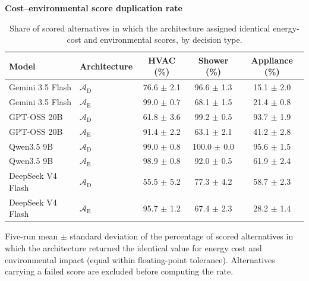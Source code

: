 \begin{table}[htbp]
\begin{threeparttable}
  \footnotesize
  \centering
  \textbf{Cost--environmental score duplication rate}
  \begin{tabular}{llccc}
    \toprule
    Model & Architecture & HVAC (\%) & Shower (\%) & Appliance (\%) \\
    \midrule
    Gemini 3.5 Flash & $\mathcal{A}_{\text{D}}$ & 76.6 $\pm$ 2.1 & 96.6 $\pm$ 1.3 & 15.1 $\pm$ 2.0 \\
    \addlinespace
    Gemini 3.5 Flash & $\mathcal{A}_{\text{E}}$ & 99.0 $\pm$ 0.7 & 68.1 $\pm$ 1.5 & 21.4 $\pm$ 0.8 \\
    GPT-OSS 20B & $\mathcal{A}_{\text{D}}$ & 61.8 $\pm$ 3.6 & 99.2 $\pm$ 0.5 & 93.7 $\pm$ 1.9 \\
    \addlinespace
    GPT-OSS 20B & $\mathcal{A}_{\text{E}}$ & 91.4 $\pm$ 2.2 & 63.1 $\pm$ 2.1 & 41.2 $\pm$ 2.8 \\
    Qwen3.5 9B & $\mathcal{A}_{\text{D}}$ & 99.0 $\pm$ 0.8 & 100.0 $\pm$ 0.0 & 95.6 $\pm$ 1.5 \\
    \addlinespace
    Qwen3.5 9B & $\mathcal{A}_{\text{E}}$ & 98.9 $\pm$ 0.8 & 92.0 $\pm$ 0.5 & 61.9 $\pm$ 2.4 \\
    DeepSeek V4 Flash & $\mathcal{A}_{\text{D}}$ & 55.5 $\pm$ 5.2 & 77.3 $\pm$ 4.2 & 58.7 $\pm$ 2.3 \\
    \addlinespace
    DeepSeek V4 Flash & $\mathcal{A}_{\text{E}}$ & 95.7 $\pm$ 1.2 & 67.4 $\pm$ 2.3 & 28.2 $\pm$ 1.4 \\
    \bottomrule
  \end{tabular}
  \begin{tablenotes}
    \item Five-run mean $\pm$ standard deviation of the percentage of scored
    alternatives in which the architecture returned the identical value for
    energy cost and environmental impact (equal within floating-point tolerance).
    Alternatives carrying a failed score are excluded before computing the rate.
  \end{tablenotes}
\end{threeparttable}
\caption{Share of scored alternatives in which the architecture assigned
identical energy-cost and environmental scores, by decision type.}
\label{tab:score_duplication}
\end{table}
